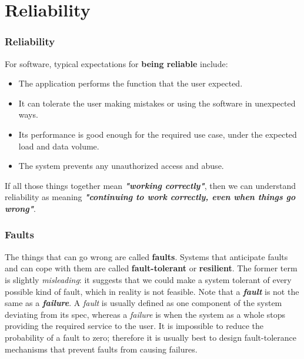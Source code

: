\documentclass{beamer}
\begin{document}
\section{Reliability}
\begin{frame}\frametitle{Reliability}
\scriptsize
For software, typical expectations for \textbf{being reliable} include:
\vfill
\begin{itemize}
    \item The application performs the function that the user expected. \vfill
    \item It can tolerate the user making mistakes or using the software
    in unexpected ways. \vfill
    \item Its performance is good enough for the required use case,
    under the expected load and data volume. \vfill
    \item The system prevents any unauthorized access and abuse. \vfill
\end{itemize}
\vfill
If all those things together mean \textbf{\textit{"working correctly"}}, then we can
understand reliability as meaning \textbf{\textit{"continuing to work correctly,
even when things go wrong"}}.
\end{frame}

\begin{frame}\frametitle{Faults}
\scriptsize
The things that can go wrong are called \textbf{faults}.
\vfill
Systems that anticipate faults and can cope with them are called \textbf{fault-tolerant} or \textbf{resilient}.
\vfill
The former term is slightly \emph{misleading}: it suggests that we could make
a system tolerant of every possible kind of fault, which in reality is not feasible.
\vfill
Note that a \textbf{\textit{fault}} is not the same as a \textbf{\textit{failure}}.
\vfill
A \emph{fault} is usually defined as one component of the system deviating from its spec,
whereas a \emph{failure} is when the system as a whole stops providing the required service to the user.
\vfill
It is impossible to reduce the probability of a fault to zero;
therefore it is usually best to design fault-tolerance mechanisms that prevent faults from causing failures.
\end{frame}
\end{document}
